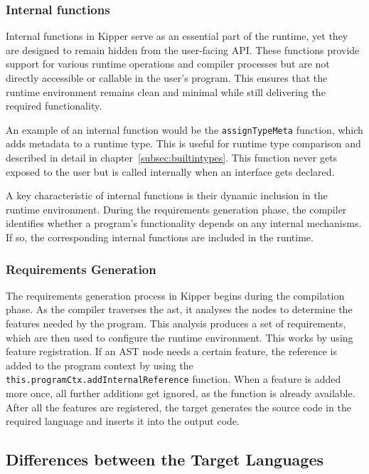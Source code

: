 \subsubsection{Internal functions}

Internal functions in Kipper serve as an essential part of the runtime, yet they are designed to remain hidden from the user-facing API. These functions provide support for various runtime operations and compiler processes but are not directly accessible or callable in the user's program. This ensures that the runtime environment remains clean and minimal while still delivering the required functionality.

An example of an internal function would be the \lstinline|assignTypeMeta| function, which adds metadata to a runtime type. This is useful for runtime type comparison and described in detail in chapter~\ref{subsec:builtintypes}. This function never gets exposed to the user but is called internally when an interface gets declared.

A key characteristic of internal functions is their dynamic inclusion in the runtime environment. During the requirements generation phase, the compiler identifies whether a program's functionality depends on any internal mechanisms. If so, the corresponding internal functions are included in the runtime.

\subsubsection{Requirements Generation}

The requirements generation process in Kipper begins during the compilation phase. As the compiler traverses the \acrshort{ast}, it analyses the nodes to determine the features needed by the program. This analysis produces a set of requirements, which are then used to configure the runtime environment. This works by using feature registration. If an AST node needs a certain feature, the reference is added to the program context by using the \lstinline|this.programCtx.addInternalReference| function. When a feature is added more once, all further additions get ignored, as the function is already available. After all the features are registered, the target generates the source code in the required language and inserts it into the output code.

\subsection{Differences between the Target Languages}

